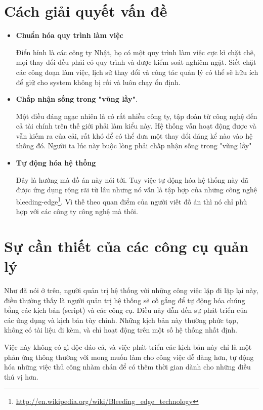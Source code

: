 \section{Cách giải quyết vấn đề}
\begin{itemize}
\item \textbf{Chuẩn hóa quy trình làm việc}

Điển hỉnh là các công ty Nhật, họ có một quy trình làm việc cực kì chặt chẽ, mọi thay đổi đều phải có quy trình và được kiểm soát nghiêm ngặt. Siết chặt các công đoạn làm việc, lịch sử thay đổi và công tác quản lý có thể sẽ hữu ích để giữ cho system không bị rối và luôn chạy ổn định.

\item \textbf{Chấp nhận sống trong "vũng lầy"}. 

Một điều đáng ngạc nhiên là có rất nhiều công ty, tập đoàn từ công nghệ đến cả tài chính trên thế giới phải làm kiểu này. Hệ thống vẫn hoạt động được và vẫn kiếm ra của cải, rất khó để có thể đưa một thay đổi đáng kể nào vào hệ thống đó. Người ta lúc này buộc lòng phải chấp nhận sống trong "vũng lầy"

\item \textbf{Tự động hóa hệ thống}

Đây là hướng mà đồ án này nói tới. Tuy việc tự động hóa hệ thống này đã được ứng dụng rộng rãi từ lâu nhưng nó vẫn là tập hợp của những công nghệ bleeding-edge\footnote{\url{http://en.wikipedia.org/wiki/Bleeding_edge_technology}}. Vì thế theo quan điểm của người viết đồ án thì nó chỉ phù hợp với các công ty công nghệ mà thôi.

\end{itemize}

\newpage
\section{Sự cần thiết của các công cụ quản lý}

Như đã nói ở trên, người quản trị hệ thống với những công việc lặp đi lặp lại này, điều thường thấy là người quản trị hệ thống sẽ cố gắng để tự động hóa chúng bằng các kịch bản (script) và các công cụ. Điều này dẫn đến sự phát triển của các ứng dụng và kịch bản tùy chỉnh. Những kịch bản này thường phức tạp, không có tài liệu đi kèm, và chỉ hoạt động trên một số hệ thống nhất định.

Việc này không có gì độc đáo cả, và việc phát triển các kịch bản này chỉ là một phản ứng thông thường với mong muốn làm cho công việc dễ dàng hơn, tự động hóa những việc thủ công nhàm chán để có thêm thời gian dành cho những điều thú vị hơn.

